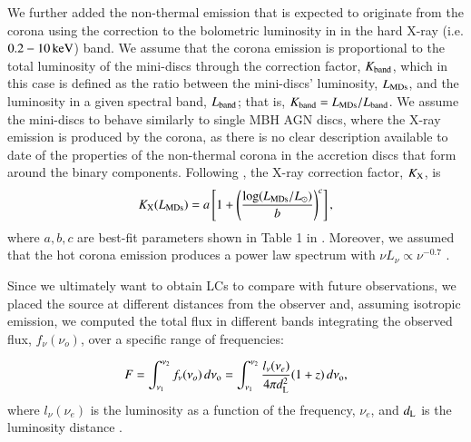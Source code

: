 \documentclass{aa}
\begin{document}
We further added the non-thermal emission that is expected to originate from the corona using the correction to the bolometric luminosity in \cite{Duras2020} in the hard X-ray (i.e. $0.2 - 10 \, \rm{keV}$) band.
We assume that the corona emission is proportional to the total luminosity of the mini-discs through the correction factor, $K_{\rm band}$, which in this case is defined as the ratio between the mini-discs' luminosity, $L_{\rm MDs}$, and the luminosity in a given spectral band, $L_{\rm{band}}$; that is, $K_{\rm band}= L_{\rm MDs}/L_{\rm band}$. We assume the mini-discs to behave similarly to single MBH AGN discs, where the X-ray emission is produced by the corona, as there is no clear description available to date of the properties of the non-thermal corona in the accretion discs that form around the binary components.
Following \citep{Duras2020}, the X-ray correction factor, $K_{\rm X}$, is
\begin{equation}
    \label{eqn:kx}
    K_{\rm X}(L_{\rm MDs}) = a \left [ 1 + \left (\frac{\log(L_{\rm MDs}/L_{\odot})}{b} \right )^c \right ]
,\end{equation}
where $a,b,c$ are best-fit parameters shown in Table 1 in \citep{Duras2020}.
Moreover, we assumed that the hot corona emission produces a power law spectrum with $\nu L_\nu\propto\nu^{-0.7}$ 
\citep{Regan2019}.

Since we ultimately want to obtain LCs to compare with future observations, we placed the source at different distances from the observer and, assuming isotropic emission, we computed the total flux in different bands integrating the observed flux, $f_{\nu}(\nu_{o})$, over a specific range of frequencies:


\begin{equation}
    \label{eqn:flux}
    F = \int_{\nu_1}^{\rm \nu_2} f_{\nu}(\nu_{o}) \, d \nu_{\rm o} = \int_{\nu_1}^{\rm \nu_2} \frac{l_{\rm \nu}(\nu_e)}{4\pi d_{\rm L }^2}(1+z) \, d \nu_{\rm o},
\end{equation}where $l_{\nu}(\nu_{e})$ is the luminosity as a function of the frequency, $\nu_e$, and $d_{\rm L }$ is the luminosity distance \citep{Hogg2000, hogg2002k}.

\end{document}
